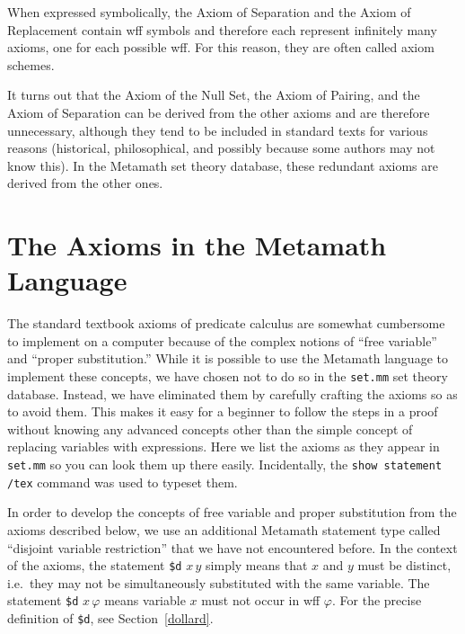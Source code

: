 When expressed symbolically, the Axiom of Separation and the Axiom of
Replacement contain wff symbols and therefore each represent infinitely many
axioms, one for each possible wff. For this reason, they are often called
axiom schemes.

It turns out that the Axiom of the Null Set, the Axiom of Pairing, and the
Axiom of Separation can be derived from the other axioms and are therefore
unnecessary, although they tend to be included in standard texts for various
reasons (historical, philosophical, and possibly because some authors may not
know this).  In the Metamath set theory database, these
redundant axioms are derived from the other ones.

\section{The Axioms in the Metamath Language}\label{metaaxioms}

The standard textbook axioms of predicate calculus are somewhat
cumbersome to implement on a computer because of the complex notions of
``free variable'' and ``proper
substitution.''
While it is possible to use the Metamath language to
implement these concepts, we have chosen not to do so in the
\texttt{set.mm} set theory database.  Instead, we have eliminated them
by carefully crafting the axioms so as to avoid them.  This makes it
easy for a beginner to follow the steps in a proof without knowing any
advanced concepts other than the simple concept of
replacing
variables with expressions.  Here we list the axioms as they appear in
\texttt{set.mm} so you can
look them up there easily.  Incidentally, the \texttt{show statement
/tex} command was used to
typeset them.

In order to develop the concepts of free variable and proper
substitution from the axioms described below, we use an additional
Metamath statement type called ``disjoint variable
restriction'' that we have not encountered
before.  In the context of the axioms, the statement \texttt{\$d} $ x\,
y$ simply means that $x$ and $y$ must be
distinct, i.e.\ they may not be simultaneously
substituted
with the same variable.  The statement \texttt{\$d} $ x\, \varphi$ means
variable $x$ must not occur in wff $\varphi$.  For the precise
definition of \texttt{\$d}, see Section~\ref{dollard}.


